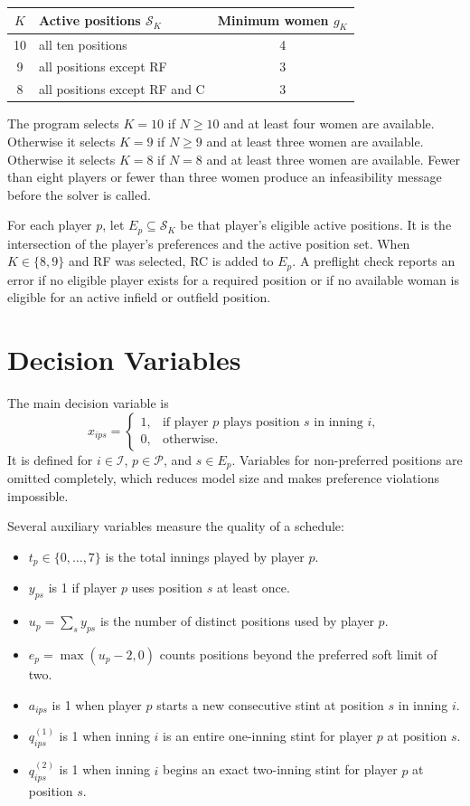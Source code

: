 \documentclass[11pt]{article}
\begin{document}
\begin{center}
\begin{tabular}{clc}
\toprule
$K$ & Active positions $\mathcal{S}_K$ & Minimum women $g_K$\\
\midrule
10 & all ten positions & 4\\
9  & all positions except RF & 3\\
8  & all positions except RF and C & 3\\
\bottomrule
\end{tabular}
\end{center}

The program selects $K=10$ if $N\geq 10$ and at least four women are
available. Otherwise it selects $K=9$ if $N\geq9$ and at least three women are
available. Otherwise it selects $K=8$ if $N=8$ and at least three women are
available. Fewer than eight players or fewer than three women produce an
infeasibility message before the solver is called.

For each player $p$, let $E_p\subseteq\mathcal{S}_K$ be that player's eligible
active positions. It is the intersection of the player's preferences and the
active position set. When $K\in\{8,9\}$ and RF was selected, RC is added to
$E_p$. A preflight check reports an error if no eligible player exists for a
required position or if no available woman is eligible for an active infield
or outfield position.

\section{Decision Variables}

The main decision variable is
\[
x_{ips} =
\begin{cases}
1, & \text{if player $p$ plays position $s$ in inning $i$},\\
0, & \text{otherwise.}
\end{cases}
\]
It is defined for $i\in\mathcal{I}$, $p\in\mathcal{P}$, and
$s\in E_p$. Variables for non-preferred positions are omitted completely,
which reduces model size and makes preference violations impossible.

Several auxiliary variables measure the quality of a schedule:
\begin{itemize}
    \item $t_p\in\{0,\ldots,7\}$ is the total innings played by player $p$.
    \item $y_{ps}$ is 1 if player $p$ uses position $s$ at least once.
    \item $u_p=\sum_s y_{ps}$ is the number of distinct positions used by
    player $p$.
    \item $e_p=\max(u_p-2,0)$ counts positions beyond the preferred soft limit
    of two.
    \item $a_{ips}$ is 1 when player $p$ starts a new consecutive stint at
    position $s$ in inning $i$.
    \item $q^{(1)}_{ips}$ is 1 when inning $i$ is an entire one-inning stint
    for player $p$ at position $s$.
    \item $q^{(2)}_{ips}$ is 1 when inning $i$ begins an exact two-inning stint
    for player $p$ at position $s$.
\end{itemize}
\end{document}
